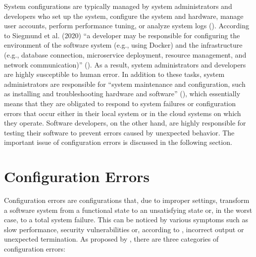 \documentclass[english,bachelor]{swsLeipzig}
\begin{document}
System configurations are typically managed by system administrators and developers who set up the system, configure 
the system and hardware, manage user accounts, perform performance tuning, or analyze system logs (\citet{wikimedia:2022}). According to 
Siegmund et al. (2020) ``a developer may be responsible for configuring the environment of the software system (e.g., 
using Docker) and the infrastructure (e.g., database connection, microservice deployment, resource management, and 
network communication)'' (\citet{siegmund:2020}). As a result, system administrators and developers are highly susceptible to human error. 
In addition to these tasks, system administrators are responsible for ``system maintenance and configuration, such as 
installing and troubleshooting hardware and software'' (\citet{hanna:2021}), which essentially means that they are obligated to 
respond to system failures or configuration errors that occur either in their local system or in the cloud systems 
on which they operate. Software developers, on the other hand, are highly responsible for testing their software 
to prevent errors caused by unexpected behavior. The important issue of configuration errors is discussed in the 
following section.

\section{Configuration Errors}\label{configuration_errors}
Configuration errors are configurations that, due to improper settings, transform a software system from a functional 
state to an unsatisfying state or, in the worst case, to a total system failure. This can be noticed by various 
symptoms such as slow performance, security vulnerabilities or, according to \citet{zhang:2013}, incorrect 
output or unexpected termination. As proposed by \citet{yinma:2011}, there are three categories of 
configuration errors:
\end{document}
